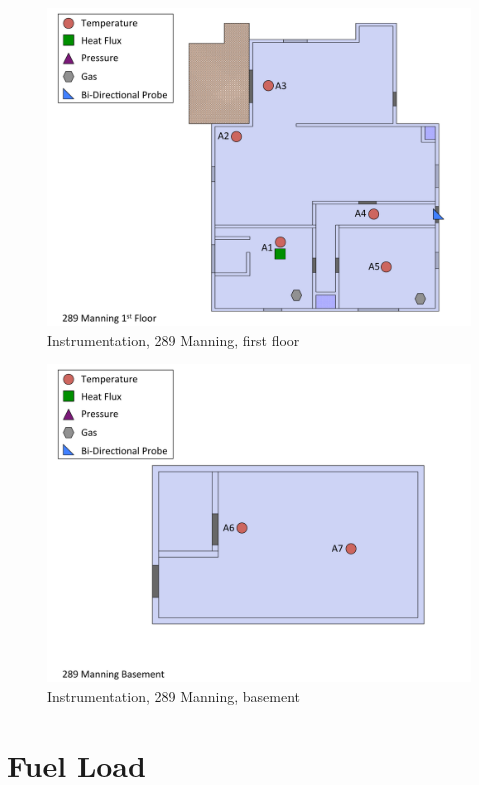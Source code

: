 \documentclass[12pt,oneside]{book}
\begin{document}
\begin{figure}[!ht]
\includegraphics[width=6in]{../Figures/Instrumentation/289_Manning_1st_Floor}
\caption{Instrumentation, 289 Manning, first floor}
\label{fig:Instrumentation_289_Manning_1st_Floor}
\end{figure}

\begin{figure}[!ht]
\includegraphics[width=6in]{../Figures/Instrumentation/289_Manning_Basement}
\caption{Instrumentation, 289 Manning, basement}
\label{fig:Instrumentation_289_Manning_basement}
\end{figure}


\clearpage


\section{Fuel Load}
\label{sec:Fuel_Load}
\end{document}
